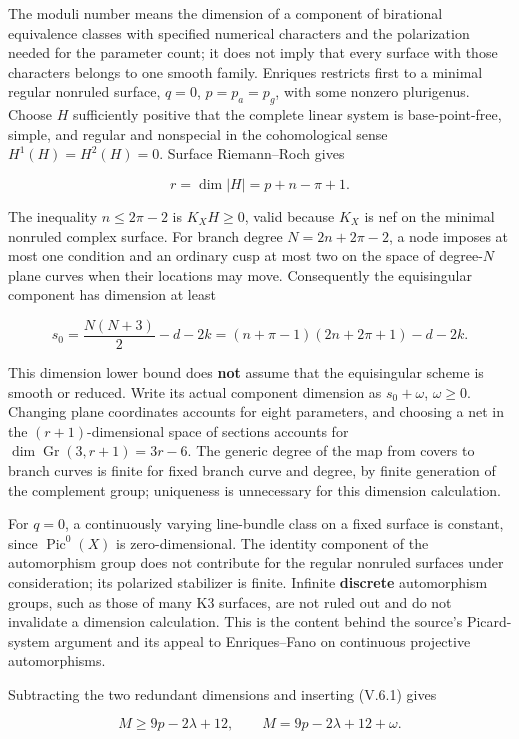 The moduli number means the dimension of a component of birational equivalence classes with specified numerical characters and the polarization needed for the parameter count; it does not imply that every surface with those characters belongs to one smooth family. Enriques restricts first to a minimal regular nonruled surface, \(q=0\), \(p=p_a=p_g\), with some nonzero plurigenus. Choose \(H\) sufficiently positive that the complete linear system is base-point-free, simple, and regular and nonspecial in the cohomological sense \(H^1(H)=H^2(H)=0\). Surface Riemann--Roch gives

\[
r=\dim|H|=p+n-\pi+1.
\]

The inequality \(n\le2\pi-2\) is \(K_X H\ge0\), valid because \(K_X\) is nef on the minimal nonruled complex surface. For branch degree \(N=2n+2\pi-2\), a node imposes at most one condition and an ordinary cusp at most two on the space of degree-\(N\) plane curves when their locations may move. Consequently the equisingular component has dimension at least

\[
s_0=\frac{N(N+3)}2-d-2k
=(n+\pi-1)(2n+2\pi+1)-d-2k.
\]

This dimension lower bound does \textbf{not} assume that the equisingular scheme is smooth or reduced. Write its actual component dimension as \(s_0+\omega\), \(\omega\ge0\). Changing plane coordinates accounts for eight parameters, and choosing a net in the \((r+1)\)-dimensional space of sections accounts for \(\dim\operatorname{Gr}(3,r+1)=3r-6\). The generic degree of the map from covers to branch curves is finite for fixed branch curve and degree, by finite generation of the complement group; uniqueness is unnecessary for this dimension calculation.

For \(q=0\), a continuously varying line-bundle class on a fixed surface is constant, since \(\operatorname{Pic}^0(X)\) is zero-dimensional. The identity component of the automorphism group does not contribute for the regular nonruled surfaces under consideration; its polarized stabilizer is finite. Infinite \textbf{discrete} automorphism groups, such as those of many K3 surfaces, are not ruled out and do not invalidate a dimension calculation. This is the content behind the source's Picard-system argument and its appeal to Enriques--Fano on continuous projective automorphisms.

Subtracting the two redundant dimensions and inserting (V.6.1) gives

\[
M\ge9p-2\lambda+12,\qquad
M=9p-2\lambda+12+\omega. \tag{V.11.1}
\]

